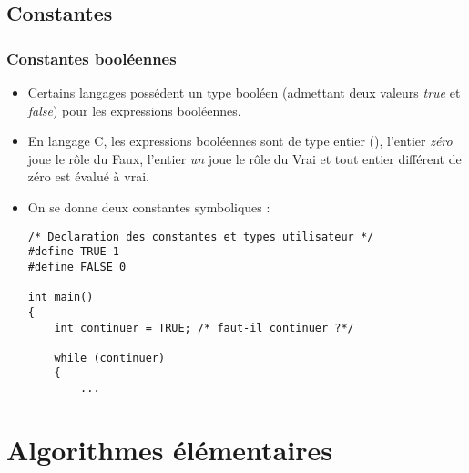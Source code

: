 \documentclass[xcolor=pdftex,svgnames,table]{beamer}
\begin{document}
\subsection{Constantes}
\begin{frame}[fragile]
  \frametitle{Constantes booléennes}
  \begin{itemize}
    \item
 Certains langages possédent un type booléen (admettant deux
  valeurs \emph{true} et \emph{false}) pour les expressions
  booléennes.\pause

\item En langage C, les
  expressions booléennes sont de type entier (), l'entier \emph{zéro}
  joue le rôle du Faux, l'entier \emph{un} joue le rôle du Vrai et tout
  entier différent de zéro est évalué à vrai.\pause

\item On se donne deux
  constantes symboliques :
\begin{lstlisting}[escapechar={\%},basicstyle=\scriptsize\ttfamily]
/* Declaration des constantes et types utilisateur */
#define TRUE 1
#define FALSE 0

int main()
{
    int continuer = TRUE; /* faut-il continuer ?*/

    while (continuer)
    {
        ...
\end{lstlisting}

  \end{itemize}
\end{frame}


\section{Algorithmes élémentaires}
\end{document}
